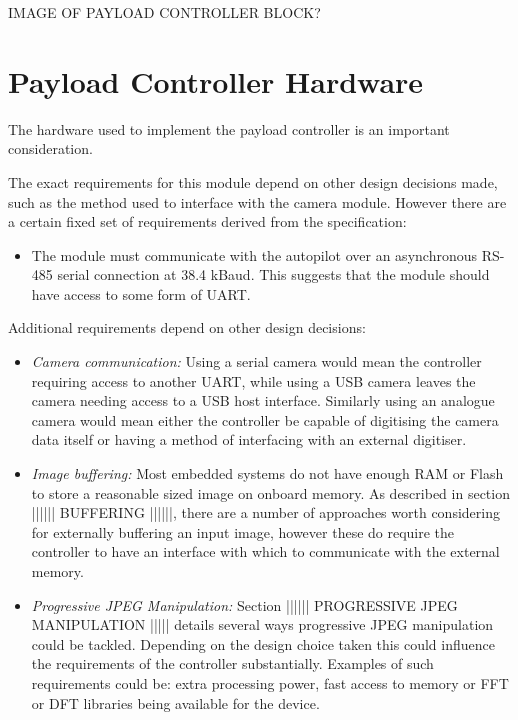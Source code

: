 
IMAGE OF PAYLOAD CONTROLLER BLOCK?

\section{Payload Controller Hardware}
The hardware used to implement the payload controller is an important consideration.

The exact requirements for this module depend on other design decisions made, such as the method used to interface with the camera module. However there are a certain fixed set of requirements derived from the specification:

\begin{itemize}
\item The module must communicate with the autopilot over an asynchronous RS-485 serial connection at 38.4 kBaud. This suggests that the module should have access to some form of UART.
\end{itemize}

Additional requirements depend on other design decisions:

\begin{itemize}
\item \emph{Camera communication:} Using a serial camera would mean the controller requiring access to another UART, while using a USB camera leaves the camera needing access to a USB host interface. Similarly using an analogue camera would mean either the controller be capable of digitising the camera data itself or having a method of interfacing with an external digitiser.
 
\item \emph{Image buffering:} Most embedded systems do not have enough RAM or Flash to store a reasonable sized image on onboard memory. As described in section |||||| BUFFERING ||||||, there are a number of approaches worth considering for externally buffering an input image, however these do require the controller to have an interface with which to communicate with the external memory. 

\item \emph{Progressive JPEG Manipulation:} Section |||||| PROGRESSIVE JPEG MANIPULATION ||||| details several ways progressive JPEG manipulation could be tackled. Depending on the design choice taken this could influence the requirements of the controller substantially. Examples of such requirements could be: extra processing power, fast access to memory or FFT or DFT libraries being available for the device.
\end{itemize}

